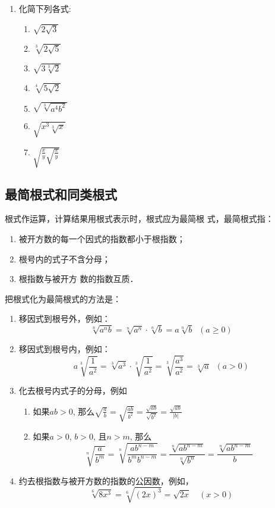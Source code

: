 \begin{ex}
\begin{enumerate}
\item 化简下列各式:
\begin{multicols}{2}
    \begin{enumerate}
    \item $\sqrt{2 \sqrt{3}}$
    \item $\sqrt[3]{2 \sqrt{5}}$
    \item $\sqrt{3\sqrt[3]{2}}$
    \item $\sqrt[4]{5 \sqrt{2}}$
    \item $\sqrt{\sqrt[3]{a^{4} b^{2}}}$
    \item $\sqrt{x^{3} \sqrt[3]{x}}$
    \item $\sqrt{\frac{x}{y} \sqrt{\frac{x}{y}}}$
    \end{enumerate}
\end{multicols}
\end{enumerate}
     
\end{ex}


\subsection{最简根式和同类根式}
根式作运算，计算结果用根式表示时，根式应为最简根
式，最简根式指：
\begin{enumerate}
    \item 被开方数的每一个因式的指数都小于根指数；
    \item 根号内的式子不含分母；
    \item 根指数与被开方
数的指数互质．
\end{enumerate}

把根式化为最简根式的方法是：
\begin{enumerate}
    \item 移因式到根号外，例如：\[\sqrt[n]{a^nb}=\sqrt[n]{a^n}\cdot \sqrt[n]{b}=a\sqrt[n]{b}\;\;(a\ge 0)\]
    \item 移因式到根号内，例如：\[a\sqrt[3]{\frac{1}{a^2}}=\sqrt[3]{a^3}\cdot \sqrt[3]{\frac{1}{a^2}}=\sqrt[3]{\frac{a^3}{a^2}}=\sqrt[3]{a}\;\;(a>0)\]
    \item 化去根号内式子的分母，例如
    \begin{enumerate}
        \item 如果$ab>0$, 那么$\sqrt{\frac{a}{b}}=\sqrt{\frac{ab}{b^2}}=\frac{\sqrt{ab}}{\sqrt{b^2}}=\frac{\sqrt{ab}}{|b|}$
        \item 如果$a>0$, $b>0$, 且$n>m$, 那么
        \[\sqrt[n]{\frac{a}{b^m}}=\sqrt[n]{\frac{ab^{n-m}}{b^mb^{n-m}}}=\frac{\sqrt[n]{ab^{n-m}}}{\sqrt[n]{b^n}}=\frac{\sqrt[n]{ab^{n-m}}}{b} \]
    \end{enumerate}
\item 约去根指数与被开方数的指数的公因数，例如，
\[\sqrt[6]{8x^3}=\sqrt[6]{(2x)^3}=\sqrt{2x}\quad (x>0)\]
\end{enumerate}

